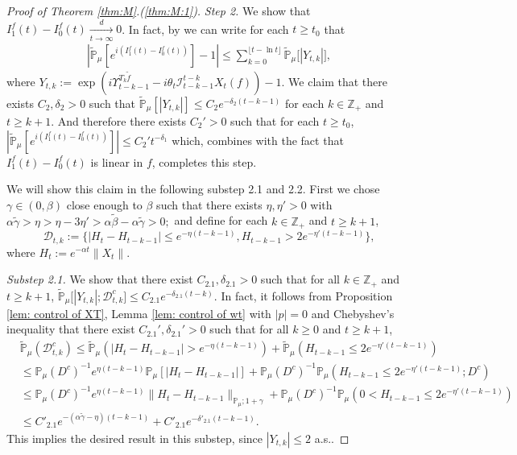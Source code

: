 \documentclass[12pt,a4paper]{amsart}
\theoremstyle{plain}
\theoremstyle{definition}
\numberwithin{equation}{section}
\begin{document}
\begin{proof}[Proof of Theorem \ref{thm:M}.(\ref{thm:M:1})]
  \emph{Step 2.} We show that $I^f_1(t) - I^f_0(t) \xrightarrow[t\to \infty]{d} 0$.
  In fact,  by \cite[Lemma 3.4.3]{Durrett2010Probability} we can write for each $t\geq t_0$ that
\begin{align}    
  \label{eq:PM:S:1}
|\mathbb{\widetilde{P}}_{\mu}[e^{i (I^f_1(t) - I^f_0(t) ) }] - 1|
    \leq \sum_{k=0}^{\lfloor t-\ln t \rfloor}\mathbb{\widetilde{P}}_{\mu}\big[|Y_{t,k}|\big],
\end{align}
where
\(
Y_{t,k}
:= \exp(i \Upsilon_{t-k-1}^{T_{k} \tilde f} - i\theta_t \mathcal I_{t-k-1}^{t-k} X_t(f)) - 1.
\)
We claim that there exists $C_2, \delta_2>0$ such that \(\widetilde {\mathbb P}_\mu [|Y_{t,k}|] \leq C_2 e^{-\delta_2 (t-k-1)}\) for each $k\in \mathbb Z_+$ and $t\geq k+1$.
And therefore there exists $C_2'>0$ such that for each $t \geq t_0$, $|\mathbb{\widetilde{P}}_{\mu}[e^{i (I^f_1(t)- I^f_0(t))}]| \leq C_2't^{-\delta_1}$ which, combines with the fact that $I^f_1(t) - I^f_0(t)$ is linear in $f$, completes this step.

We will show this claim in the following substep 2.1 and 2.2. 
First we chose $\gamma \in (0,\beta)$ close enough to $\beta$ such that there exists $\eta,\eta'>0$ with
\(
\alpha \tilde \gamma
>\eta
> \eta - 3\eta' 
> \alpha \tilde \beta - \alpha \tilde \gamma 
> 0;
\)
and define for each $k \in \mathbb Z_+$ and $t\geq k+1$,
\[  
\mathcal{D}_{t,k}
  :=\{|H_t-H_{t-k-1}|\leq  e^{-\eta (t-k-1)}, H_{t-k-1}> 2e^{-\eta' (t-k-1)}\},
\]
where $H_t := e^{-\alpha t}\|X_t\|$.

  \emph{Substep 2.1.} We show that there exist $C_{2.1},\delta_{2.1} >0$ such that for all $k \in \mathbb Z_+$ and $t\geq k+1$, $ \mathbb{\widetilde{P}}_{\mu} \big[ |Y_{t,k}| ;\mathcal{D}^c_{t,k} \big] \leq C_{2.1} e^{-\delta_{2.1} (t-k)}.$ 
  In fact, it follows from Proposition \ref{lem: control of XT}, Lemma \ref{lem: control of wt} with $|p|=0$ and Chebyshev's inequality that there exist $C_{2.1}', \delta_{2.1}'>0$ such that for all $k \geq 0$ and $t\geq k+1$,
  \begin{align}
    \label{eq: prob of Dtkc}
    & \mathbb{\widetilde{P}}_{\mu}(\mathcal{D}_{t,k}^c)
    \leq \mathbb{\widetilde{P}}_{\mu}(|H_t-H_{t-k-1}| > e^{-\eta (t-k-1)})+\mathbb{\widetilde{P}}_{\mu}(H_{t-k-1}\leq 2e^{-\eta'(t-k-1)}) \\
    & \leq \mathbb{P}_{\mu}(D^c)^{-1}e^{\eta(t-k-1)}\mathbb{P}_{\mu}[|H_t-H_{t-k-1}|] +  \mathbb{P}_{\mu}(D^c)^{-1} \mathbb P_\mu(H_{t-k-1}\leq 2e^{-\eta'(t-k-1)}; D^c) \\
    & \leq \mathbb{P}_{\mu}(D^c)^{-1}  e^{\eta(t-k-1)}\|H_t - H_{t-k-1}\|_{\mathbb P_\mu; 1+\gamma} + \mathbb{P}_{\mu}(D^c)^{-1} \mathbb P_\mu(0<H_{t-k-1}\leq 2e^{-\eta'(t-k-1)}) \\
    & \leq C'_{2.1} e^{-(\alpha \tilde \gamma - \eta)(t-k-1)}+C'_{2.1} e^{-\delta'_{2.1}(t-k-1)}.
  \end{align}
  This implies the desired result in this substep, since $|Y_{t,k}| \leq 2$ a.s..
 

\end{proof}
\end{document}
